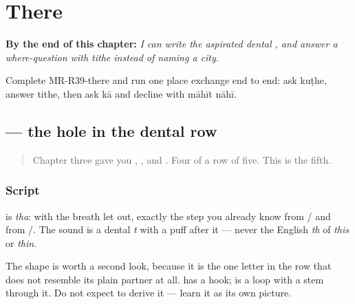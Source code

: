 
\chapter{There}
\label{ch:mr-there}

\begin{chapteropening}
\textbf{By the end of this chapter:} \emph{I can write the aspirated dental , and answer a where-question with tithe instead of naming a city.}

Complete MR-R39-there and run one place exchange end to end: ask kuṭhe, answer tithe, then ask kā and decline with māhīt nāhī.
\end{chapteropening}

\section[\texorpdfstring{\mr{थ} (tha)}{थ (tha)}]{ — the hole in the dental row}

\label{lesson:MR-W39-tha}



\begin{quote}
Chapter three gave you \textbf{}, \textbf{}, \textbf{} and \textbf{}. Four of a row of five. This is the fifth.
\end{quote}

\subsection*{Script}
\begin{quote}
\end{quote}

\textbf{} is \emph{tha}: \textbf{} with the breath let out, exactly the step you already know from \textbf{}/\textbf{} and from \textbf{}/\textbf{}. The sound is a dental \emph{t} with a puff after it — never the English \emph{th} of \emph{this} or \emph{thin}.

The shape is worth a second look, because it is the one letter in the row that does not resemble its plain partner at all. \textbf{} has a hook; \textbf{} is a loop with a stem through it. Do not expect to derive it — learn it as its own picture.


